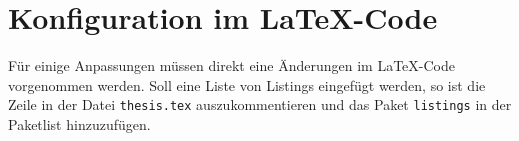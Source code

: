 \section{Konfiguration im \LaTeX -Code}\label{sec:codechanges}
Für einige Anpassungen müssen direkt eine Änderungen im \LaTeX -Code vorgenommen werden. Soll eine Liste von Listings eingefügt werden, so ist die Zeile in der Datei \texttt{thesis.tex} auszukommentieren und das Paket \texttt{listings} in der Paketlist hinzuzufügen.
